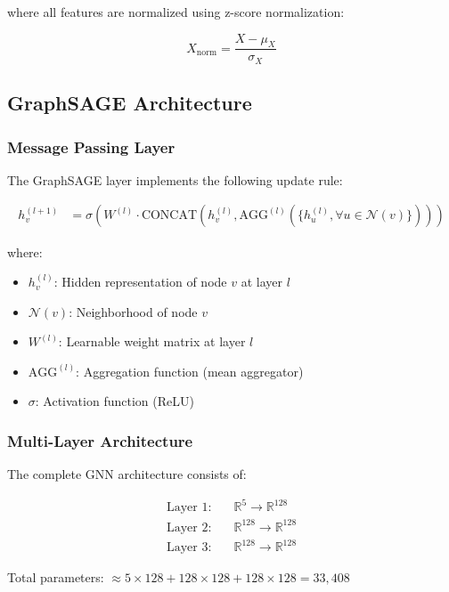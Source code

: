 \documentclass[11pt,a4paper]{article}
\begin{document}
where all features are normalized using z-score normalization:

\begin{equation}
X_{\text{norm}} = \frac{X - \mu_X}{\sigma_X}
\end{equation}

\subsection{GraphSAGE Architecture}

\subsubsection{Message Passing Layer}

The GraphSAGE layer implements the following update rule:

\begin{align}
h_v^{(l+1)} &= \sigma\left(W^{(l)} \cdot \text{CONCAT}\left(h_v^{(l)}, \text{AGG}^{(l)}\left(\{h_u^{(l)}, \forall u \in \mathcal{N}(v)\}\right)\right)\right)
\end{align}

where:
\begin{itemize}
    \item $h_v^{(l)}$: Hidden representation of node $v$ at layer $l$
    \item $\mathcal{N}(v)$: Neighborhood of node $v$
    \item $W^{(l)}$: Learnable weight matrix at layer $l$
    \item $\text{AGG}^{(l)}$: Aggregation function (mean aggregator)
    \item $\sigma$: Activation function (ReLU)
\end{itemize}

\subsubsection{Multi-Layer Architecture}

The complete GNN architecture consists of:

\begin{align}
\text{Layer 1:} \quad &\mathbb{R}^5 \rightarrow \mathbb{R}^{128} \\
\text{Layer 2:} \quad &\mathbb{R}^{128} \rightarrow \mathbb{R}^{128} \\
\text{Layer 3:} \quad &\mathbb{R}^{128} \rightarrow \mathbb{R}^{128}
\end{align}

Total parameters: $\approx 5 \times 128 + 128 \times 128 + 128 \times 128 = 33,408$
\end{document}
